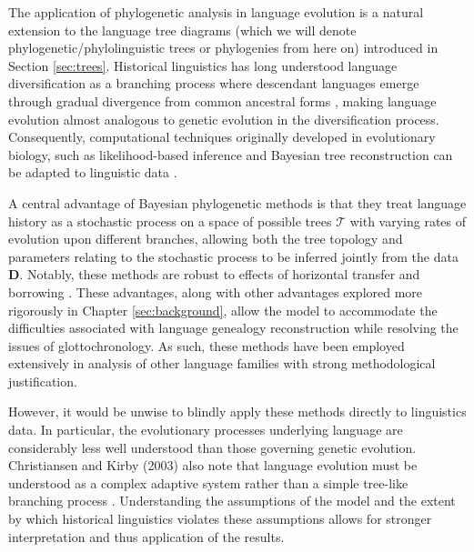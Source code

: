 The application of phylogenetic analysis in language evolution is a natural extension to the language tree diagrams (which we will denote phylogenetic/phylolinguistic trees or phylogenies from here on) introduced in Section \ref{sec:trees}. Historical linguistics has long understood language diversification as a branching process where descendant languages emerge through gradual divergence from common ancestral forms \cite{Pellard2026}, making language evolution almost analogous to genetic evolution in the diversification process. Consequently, computational techniques originally developed in evolutionary biology, such as likelihood-based inference and Bayesian tree reconstruction can be adapted to linguistic data \cite{Greenhill2009}. 

A central advantage of Bayesian phylogenetic methods is that they treat language history as a stochastic process on a space of possible trees $\mathcal{T}$ with varying rates of evolution upon different branches, allowing both the tree topology and parameters relating to the stochastic process to be inferred jointly from the data $\mathbf{D}$. Notably, these methods are robust to effects of horizontal transfer and borrowing \cite{Gray2003}. 
These advantages, along with other advantages explored more rigorously in Chapter \ref{sec:background}, allow the model to accommodate the difficulties associated with language genealogy reconstruction while resolving the issues of glottochronology. As such, these methods have been employed extensively in analysis of other language families \cite{Savelyev2020, Robbeets2018, Greenhill2009, Grollemund2015, Bouckaert2018, Honkola2013, Lee2015, Gerardi2023} with strong methodological justification. 

However, it would be unwise to blindly apply these methods directly to linguistics data. In particular, the evolutionary processes underlying language are considerably less well understood than those governing genetic evolution. Christiansen and Kirby (2003) also note that language evolution must be understood as a complex adaptive system rather than a simple tree-like branching process \cite{Christiansen2003}. Understanding the assumptions of the model and the extent by which historical linguistics violates these assumptions allows for stronger interpretation and thus application of the results.

